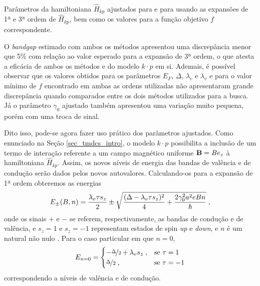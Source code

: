 \begin{table}[p]
  \centering
  \begin{subtable}{\textwidth}
    \centering
    
    \caption{}
    \label{tab:crs2}
  \end{subtable}
  \\
  \vspace{0.6cm}
  \begin{subtable}{\textwidth}
    \centering
    
    \caption{}
    \label{tab:crse2}
  \end{subtable}
  \caption{
    Parâmetros da hamiltoniana $ \hat{H}_{kp} $ ajustados para  
    e para   usando as expansões de 1ª e 3ª ordem
    de $ \hat{H}_{kp} $, bem como os valores para a função objetivo $f$ correspondente.
  }
  \label{tab:fit_results}
\end{table}

O \textit{bandgap} estimado com ambos os métodos apresentou uma discrepância
menor que 5\% com relação ao valor esperado para a expansão de 3ª ordem, o que
atesta a eficácia de ambos os métodos e do modelo $ k \cdot p $ em si. Ademais,
é possível observar que os valores obtidos para os parâmetros $E_F$, $\Delta$,
$\lambda_c$ e $\lambda_v$ e para o valor mínimo de $f$ encontrado em ambas as
ordens utilizadas não apresentaram grande discrepância quando comparados entre
os dois métodos utilizados para a busca. Já o parâmetro $\gamma_0$ ajustado
também apresentou uma variação muito pequena, porém com uma troca de sinal.

Dito isso, pode-se agora fazer uso prático dos parâmetros ajustados. Como
enunciado na Seção \ref{sec_tmdcs_intro}, o modelo $ k \cdot p $ possibilita a
inclusão de um termo de interação referente a um campo magnético uniforme 
$ \mathbf{B} = B e_z $ à hamiltoniana $ \hat{H}_{kp} $. Assim, os novos níveis de
energia das bandas de valência e de condução serão dados pelos novos
autovalores. Calculando-os para a expansão de 1ª ordem obteremos as energias
\begin{equation}
  E_\pm (B, n) = \frac{\lambda_v \tau s_z}{2} \pm 
  \sqrt{
    \frac{(\Delta - \lambda_v \tau s_z)^2}{4} + 
    \frac{2 \gamma_0^2 a^2 e B n}{\hbar}
  }
  \;\mathrm{,}
  \label{eq:landau_levels}
\end{equation}
onde os sinais $+$ e $-$ se referem, respectivamente, as bandas de condução e de
valência, e $ s_z = 1 $ e $ s_z = -1 $ representam estados de spin \textit{up} e
\textit{down}, e $n$ é um natural não nulo \cite{dias2016tmdc,dias2016article,rose2013}. Para o caso
particular em que $ n = 0 $, 
\begin{equation}
  E_{n = 0} =
  \begin{cases}
    - \nicefrac{\Delta}{2} + \lambda_v s_z \;, & \text{se } \tau = 1  \\
    \nicefrac{\Delta}{2}                   \;, & \text{se } \tau = -1 \\
  \end{cases}
  \label{eq:landau_level_for_null_n}
\end{equation}
correspondendo a níveis de valência e de condução.

